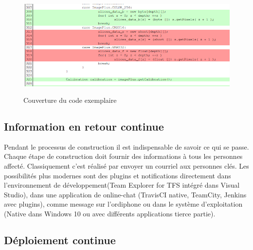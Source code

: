 \begin{figure}[H]
\centering
\includegraphics[width=15cm]{bilder/Coverage}
\caption{Couverture du code exemplaire} \cite{codecoverage}
\label{fig:coverage}
\end{figure}


\subsection{Information en retour continue}

Pendant le processus de construction il est indispensable de savoir ce qui se passe. Chaque étape de construction doit fournir des informations à tous les personnes affecté. Classiquement c'est réalisé par envoyer un courriel aux personnes clés. Les possibilités plus modernes sont des plugins et notifications directement dans l'environnement de développement(Team Explorer for TFS intégré dans Visual Studio), dans une application de online-chat (TravisCI native, TeamCity, Jenkins avec plugins), comme message sur l'ordiphone ou dans le système d'exploitation (Native dans Windows 10 ou avec différents applications tierce partie).

\newpage
\subsection{Déploiement continue}

